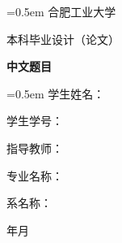 \begin{titlepage}
\centering

{
\parskip=0.5em
\linespread{1.25}
\LARGE \heiti
合\hspace{1.5em}肥\hspace{1.5em}工\hspace{1.5em}业\hspace{1.5em}大\hspace{1.5em}学\vspace{2.95cm}

本科毕业设计（论文）\vspace{2cm}

\songti \bfseries{中文题目} \vspace{6cm}
}

{
\parskip=0.5em \linespread{1.5}
\songti \sanhao
学生姓名：\underlineFixlen[8.8cm]{}

学生学号：\underlineFixlen[8.8cm]{}

指导教师：\underlineFixlen[8.8cm]{}

专业名称：\underlineFixlen[8.8cm]{}

系名称\hspace{1em}：\underlineFixlen[8.8cm]{}

\vspace{3.2cm}
\large
\hspace{2em}年\hspace{2em}月
}


\end{titlepage}
